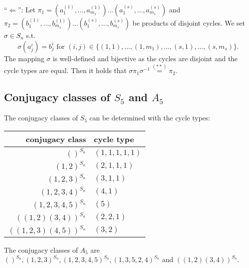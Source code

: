 ``$\Leftarrow$'': Let $\pi_1 =  (a_1^{(1)}, \dots, a_{m_1}^{(1)}) \dots (a_1^{(s)}, \dots, a_{m_s}^{(s)})$ and $\pi_2 =  (b_1^{(1)}, \dots, b_{m_1}^{(1)}) \dots (b_1^{(s)}, \dots, b_{m_s}^{(s)})$ be products of disjoint cycles. We set $\sigma \in S_n$ s.t. 
\[ \sigma(a_j^{i}) = b_j^{i} \text{ for } (i,j) \in \{(1,1), \dots, (1,m_1), \dots, (s,1), \dots, (s,m_s)\}. \] 
The mapping $\sigma$ is well-defined and bijective as the cycles are disjoint and the cycle types are equal. Then it holds that $\sigma \pi_1 \sigma^{-1} \stackrel{(\ast \ast)}{=} \pi_2$.


\subsection{Conjugacy classes of $S_5$ and $A_5$}
The conjugacy classes of $S_5$ can be determined with the cycle types:


\begin{tabular}{|r|l|}
  \hline
  conjugacy class & cycle type \\\hline
  $()^{S_n}$ & $(1,1,1,1,1)$ \\
  $(1,2)^{S_n}$ & $(2,1,1,1)$ \\
  $(1,2,3)^{S_n}$ & $(3,1,1)$ \\
  $(1,2,3,4)^{S_n}$ & $(4,1)$ \\
  $(1,2,3,4,5)^{S_n}$ & $(5)$ \\
  $((1,2)(3,4))^{S_n}$ & $(2,2,1)$ \\
  $((1,2,3)(4,5))^{S_n}$ & $(3,2)$ \\\hline
\end{tabular}


The conjugacy classes of $A_5$ are $()^{S_n}, (1,2,3)^{S_n}, (1,2,3,4,5)^{S_n}, (1,3,5,2,4)^{S_n}$ and $((1,2)(3,4))^{S_n}$.
